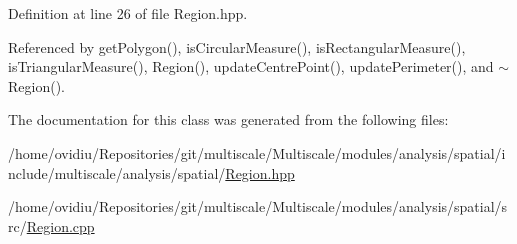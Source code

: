 Definition at line 26 of file Region.\-hpp.



Referenced by get\-Polygon(), is\-Circular\-Measure(), is\-Rectangular\-Measure(), is\-Triangular\-Measure(), Region(), update\-Centre\-Point(), update\-Perimeter(), and $\sim$\-Region().



The documentation for this class was generated from the following files\-:\begin{DoxyCompactItemize}
\item 
/home/ovidiu/\-Repositories/git/multiscale/\-Multiscale/modules/analysis/spatial/include/multiscale/analysis/spatial/\hyperlink{Region_8hpp}{Region.\-hpp}\item 
/home/ovidiu/\-Repositories/git/multiscale/\-Multiscale/modules/analysis/spatial/src/\hyperlink{Region_8cpp}{Region.\-cpp}\end{DoxyCompactItemize}
